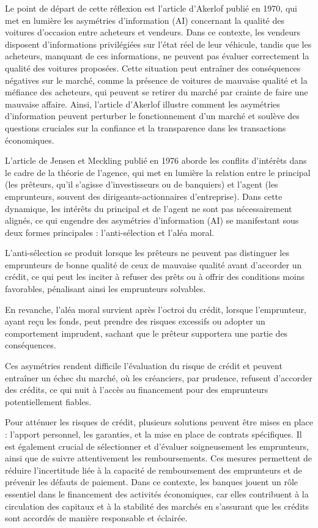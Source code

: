\documentclass[a4paper, 12pt]{report}
\begin{document}
Le point de départ de cette réflexion est l'article d'Akerlof publié en 1970, qui met en lumière les asymétries d'information (AI) concernant la qualité des voitures d'occasion entre acheteurs et vendeurs. Dans ce contexte, les vendeurs disposent d'informations privilégiées sur l'état réel de leur véhicule, tandis que les acheteurs, manquant de ces informations, ne peuvent pas évaluer correctement la qualité des voitures proposées. Cette situation peut entraîner des conséquences négatives sur le marché, comme la présence de voitures de mauvaise qualité et la méfiance des acheteurs, qui peuvent se retirer du marché par crainte de faire une mauvaise affaire. Ainsi, l'article d'Akerlof illustre comment les asymétries d'information peuvent perturber le fonctionnement d'un marché et soulève des questions cruciales sur la confiance et la transparence dans les transactions économiques.

L'article de Jensen et Meckling publié en 1976 aborde les conflits d'intérêts dans le cadre de la théorie de l'agence, qui met en lumière la relation entre le principal (les prêteurs, qu'il s'agisse d'investisseurs ou de banquiers) et l'agent (les emprunteurs, souvent des dirigeants-actionnaires d'entreprise). Dans cette dynamique, les intérêts du principal et de l'agent ne sont pas nécessairement alignés, ce qui engendre des asymétries d'information (AI) se manifestant sous deux formes principales : l'anti-sélection et l'aléa moral. 

L'anti-sélection se produit lorsque les prêteurs ne peuvent pas distinguer les emprunteurs de bonne qualité de ceux de mauvaise qualité avant d'accorder un crédit, ce qui peut les inciter à refuser des prêts ou à offrir des conditions moins favorables, pénalisant ainsi les emprunteurs solvables. 

En revanche, l'aléa moral survient après l'octroi du crédit, lorsque l'emprunteur, ayant reçu les fonds, peut prendre des risques excessifs ou adopter un comportement imprudent, sachant que le prêteur supportera une partie des conséquences. 

Ces asymétries rendent difficile l'évaluation du risque de crédit et peuvent entraîner un échec du marché, où les créanciers, par prudence, refusent d'accorder des crédits, ce qui nuit à l'accès au financement pour des emprunteurs potentiellement fiables.

Pour atténuer les risques de crédit, plusieurs solutions peuvent être mises en place : l'apport personnel, les garanties, et la mise en place de contrats spécifiques. Il est également crucial de sélectionner et d'évaluer soigneusement les emprunteurs, ainsi que de suivre attentivement les remboursements. Ces mesures permettent de réduire l'incertitude liée à la capacité de remboursement des emprunteurs et de prévenir les défauts de paiement. Dans ce contexte, les banques jouent un rôle essentiel dans le financement des activités économiques, car elles contribuent à la circulation des capitaux et à la stabilité des marchés en s'assurant que les crédits sont accordés de manière responsable et éclairée.
\end{document}
